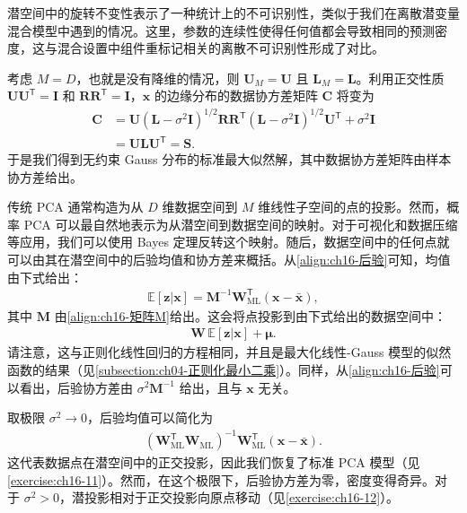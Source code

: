 \documentclass[../../main.tex]{subfiles}
\begin{document}
潜空间中的旋转不变性表示了一种统计上的不可识别性，类似于我们在离散潜变量混合模型中遇到的情况。这里，参数的连续性使得任何值都会导致相同的预测密度，这与混合设置中组件重标记相关的离散不可识别性形成了对比。

考虑 $M=D$，也就是没有降维的情况，则 $\bm{U}_M=\bm{U}$ 且 $\bm{L}_M=\bm{L}$。利用正交性质 $\bm{U}\bm{U}^{\mathsf T}=\bm{I}$ 和 $\bm{R}\bm{R}^{\mathsf T}=\bm{I}$，$\bm{x}$ 的边缘分布的数据协方差矩阵 $\bm{C}$ 将变为
\begin{align}
  \bm{C}&=\bm{U}\left(\bm{L}-\sigma^2\bm{I}\right)^{1/2}\bm{R}\bm{R}^{\mathsf T}\left(\bm{L}-\sigma^2\bm{I}\right)^{1/2}\bm{U}^{\mathsf T}+\sigma^2\bm{I}\nonumber\\
  &=\bm{U}\bm{L}\bm{U}^{\mathsf T}=\bm{S}.
  \label{align:ch16-满秩协方差}
\end{align}
于是我们得到无约束 Gauss 分布的标准最大似然解，其中数据协方差矩阵由样本协方差给出。

传统 PCA 通常构造为从 $D$ 维数据空间到 $M$ 维线性子空间的点的投影。然而，概率 PCA 可以最自然地表示为从潜空间到数据空间的映射。对于可视化和数据压缩等应用，我们可以使用 Bayes 定理反转这个映射。随后，数据空间中的任何点就可以由其在潜空间中的后验均值和协方差来概括。从\eqref{align:ch16-后验}可知，均值由下式给出：
\begin{align}
  \mathbb{E}[\bm{z}|\bm{x}]=\bm{M}^{-1}\bm{W}_{\text{ML}}^{\mathsf T}(\bm{x}-\bar{\bm{x}}),
  \label{align:ch16-后验均值}
\end{align}
其中 $\bm{M}$ 由\eqref{align:ch16-矩阵M}给出。这会将点投影到由下式给出的数据空间中：
\begin{align}
  \bm{W}\,\mathbb{E}[\bm{z}|\bm{x}]+\bm{\mu}.
  \label{align:ch16-重建映射}
\end{align}
请注意，这与正则化线性回归的方程相同，并且是最大化线性-Gauss 模型的似然函数的结果（见\cref{subsection:ch04-正则化最小二乘}）。同样，从\eqref{align:ch16-后验}可以看出，后验协方差由 $\sigma^2\bm{M}^{-1}$ 给出，且与 $\bm{x}$ 无关。

取极限 $\sigma^2\rightarrow0$，后验均值可以简化为
\begin{align}
  \left(\bm{W}_{\text{ML}}^{\mathsf T}\bm{W}_{\text{ML}}\right)^{-1}\bm{W}_{\text{ML}}^{\mathsf T}(\bm{x}-\bar{\bm{x}}).
  \label{align:ch16-投影极限}
\end{align}
这代表数据点在潜空间中的正交投影，因此我们恢复了标准 PCA 模型（见\cref{exercise:ch16-11}）。然而，在这个极限下，后验协方差为零，密度变得奇异。对于 $\sigma^2>0$，潜投影相对于正交投影向原点移动（见\cref{exercise:ch16-12}）。
\end{document}

